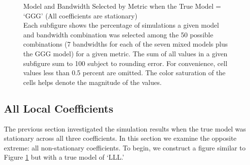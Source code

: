 \documentclass{article}\usepackage[]{graphicx}\usepackage[]{color}
\begin{document}
\begin{figure}
\caption{Model and Bandwidth Selected by Metric when the True Model = `GGG' (All coefficients are stationary) \\ Each subfigure shows the percentage of simulations a given model and bandwidth combination was selected among the 50 possible combinations (7 bandwidths for each of the seven mixed models plus the GGG model) for a given metric. The sum of all values in a given subfigure sum to 100 subject to rounding error. For convenience, cell values less than 0.5 percent are omitted. The color saturation of the cells helps denote the magnitude of the values.}
\label{fig:GGGmodelBandwidths}
\end{figure}

\subsection{All Local Coefficients}

The previous section investigated the simulation results when the true model was stationary across all three coefficients. In this section we examine the opposite extreme: all non-stationary coefficients. To begin, we construct a figure similar to Figure \ref{fig:GGGmodelBandwidths} but with a true model of `LLL.'   
\end{document}
